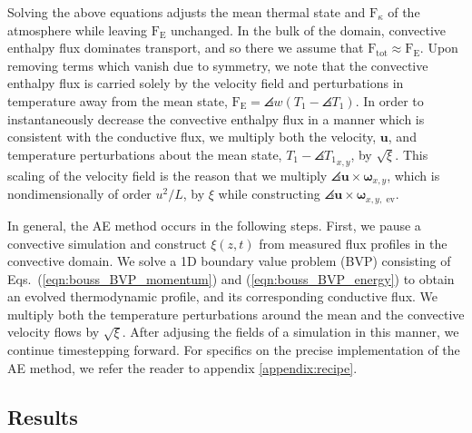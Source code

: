 Solving the above equations adjusts the mean thermal state and 
$\text{F}_{\kappa}$ of the atmosphere while leaving $\text{F}_{\text{E}}$
unchanged. In the  
bulk of the domain, convective enthalpy flux dominates transport, and so there we
assume that $\text{F}_{\text{tot}} \approx \text{F}_{\text{E}}$. Upon 
removing terms which vanish due to symmetry, we note that the convective
enthalpy flux is carried solely by the velocity field and perturbations in
temperature away from the mean state, $\text{F}_{\text{E}} = 
\angles{w(T_1 - \angles{T_1})}$.
In order to instantaneously decrease the convective enthalpy flux in a manner
which is consistent with the conductive flux, 
we multiply both the velocity, $\bm{u}$,
and temperature perturbations about the mean state, $T_1-\angles{T_1}_{x,y}$,
 by $\sqrt{\xi}$. This scaling of the velocity field is the reason that we
multiply $\angles{\bm{u}\times\bm{\omega}}_{x, y}$, which is nondimensionally
of order $u^2/L$, by $\xi$ while constructing
$\angles{\bm{u}\times\bm{\omega}}_{x, y,\text{ ev}}$.

In general, the AE method occurs in the following steps. First, we pause a convective simulation and
construct $\xi(z,t)$ from measured flux profiles in the convective domain.
We solve a 1D boundary value problem (BVP) consisting of
Eqs.~(\ref{eqn:bouss_BVP_momentum}) and (\ref{eqn:bouss_BVP_energy})
to obtain an evolved thermodynamic profile, and its corresponding conductive flux.
We multiply both the temperature perturbations around the mean and the
convective velocity flows by $\sqrt{\xi}$.
After adjusing the fields of a simulation in this manner, we continue timestepping forward.
For specifics on the precise implementation of the AE method, we refer
the reader to appendix \ref{appendix:recipe}.


\subsection{Results}
\label{sec:results}


